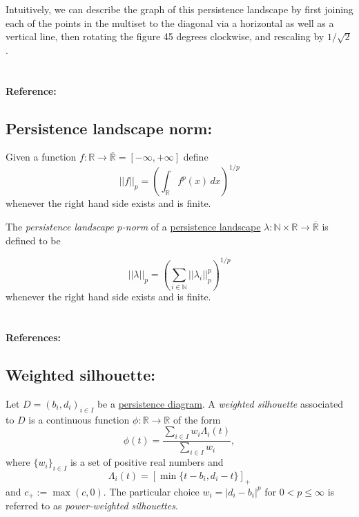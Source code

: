 \documentclass{amsart}
\begin{document}
	Intuitively, we can describe the graph of this persistence landscape by first joining each of the points in the multiset to the diagonal via a horizontal as well as a vertical line, then rotating the figure 45 degrees clockwise, and rescaling by $1/\sqrt{2}$.
	
	\paragraph{\\ Reference:} \cite{bubenik2015statistical}
	
	\subsection*{Persistence landscape norm:} \label{persistence landscape norm}
	
	Given a function $f : \mathbb R \to \overline{\mathbb R} = [-\infty, +\infty]$ define
	\begin{equation*}
	||f||_p = \left( \int_{\mathbb R} f^p(x)\, dx \right)^{1/p}
	\end{equation*}
	whenever the right hand side exists and is finite.
	
	The \textit{persistence landscape $p$-norm} of a \hyperref[persistence landscape]{persistence landscape} $\lambda : \mathbb N \times \mathbb R \to \overline{\mathbb R}$ is defined to be
	
	\begin{equation*}
	||\lambda||_p = \left( \sum_{i \in \mathbb N} ||\lambda_i||^p_p \right)^{1/p}
	\end{equation*}
	whenever the right hand side exists and is finite.

	\paragraph{\\ References:} \cite{stein2011functional, bubenik2015statistical}
	
	\subsection*{Weighted silhouette:} \label{weighted silhouettes}
	
	Let $D = {(b_i, d_i)}_{i \in I}$ be a \hyperref[persistence diagram] {persistence diagram}. A \textit{weighted silhouette} associated to $D$ is a continuous function $\phi : \mathbb R \to \mathbb R$ of the form
	\begin{equation*}
	\phi(t) = \frac{\sum_{i \in I}w_i \Lambda_i(t)}{\sum_{i \in I}w_i},
	\end{equation*}
	where $\{w_i\}_{i \in I}$ is a set of positive real numbers and
	\begin{equation*} \label{equation: lambda for persistence landscapes}
	\Lambda_i(t) = \left[ \min \{t-b_i, d_i-t\}\right]_+
	\end{equation*}
	and $c_+ := \max(c,0)$. The particular choice $w_i = \vert d_i - b_i \vert^p$ for $0 < p \leq \infty$ is referred to as \textit{power-weighted silhouettes}.
	
\end{document}
